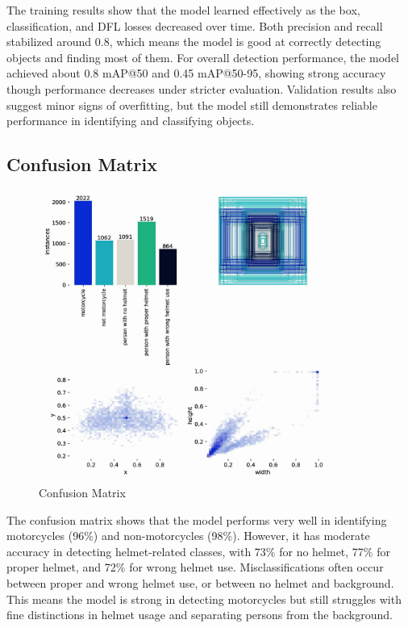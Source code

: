 \begin{refsection}
\noindent
The training results show that the model learned effectively as the box, classification, and DFL losses decreased over time. Both precision and recall stabilized around 0.8, which means the model is good at correctly detecting objects and finding most of them. For overall detection performance, the model achieved about 0.8 mAP@50 and 0.45 mAP@50-95, showing strong accuracy though performance decreases under stricter evaluation. Validation results also suggest minor signs of overfitting, but the model still demonstrates reliable performance in identifying and classifying objects.

\subsection{Confusion Matrix}
\begin{figure}[ht]
    \centering
	\includegraphics[width=0.85\textwidth]{figures/Fig 16.jpg}
	\caption[Confusion Matrix]{Confusion Matrix}
	\label{fig:confusion_matrix}
\end{figure}

\noindent
The confusion matrix shows that the model performs very well in identifying motorcycles (96\%) and non-motorcycles (98\%). However, it has moderate accuracy in detecting helmet-related classes, with 73\% for no helmet, 77\% for proper helmet, and 72\% for wrong helmet use. Misclassifications often occur between proper and wrong helmet use, or between no helmet and background. This means the model is strong in detecting motorcycles but still struggles with fine distinctions in helmet usage and separating persons from the background.


\end{refsection}
